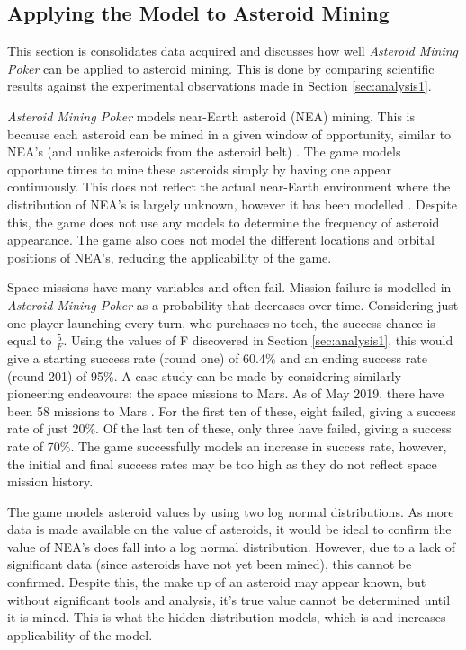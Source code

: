 \documentclass[11pt, twoside]{article}
\begin{document}
\subsection{Applying the Model to Asteroid Mining} \label{sec:FindingsAM}
This section is consolidates data acquired and discusses how well \textit{Asteroid Mining Poker} can be applied to asteroid mining. This is done by comparing scientific results against the experimental observations made in Section \ref{sec:analysis1}.

\textit{Asteroid Mining Poker} models near-Earth asteroid (NEA) mining. This is because each asteroid can be mined in a given window of opportunity, similar to NEA's (and unlike asteroids from the asteroid belt) \cite{sonter2006asteroid}. The game models opportune times to mine these asteroids simply by having one appear continuously. This does not reflect the actual near-Earth environment where the distribution of NEA's is largely unknown, however it has been modelled \cite{bottke2000understanding}. Despite this, the game does not use any models to determine the frequency of asteroid appearance. The game also does not model the different locations and orbital positions of NEA's, reducing the applicability of the game.

Space missions have many variables and often fail. Mission failure is modelled in \textit{Asteroid Mining Poker} as a probability that decreases over time. Considering just one player launching every turn, who purchases no tech, the success chance is equal to $\frac{5}{F}$. Using the values of F discovered in Section \ref{sec:analysis1}, this would give a starting success rate (round one) of 60.4\% and an ending success rate (round 201) of 95\%. A case study can be made by considering similarly pioneering endeavours: the space missions to Mars. As of May 2019, there have been 58 missions to Mars \cite{MarsExpl75:online}. For the first ten of these, eight failed, giving a success rate of just 20\%. Of the last ten of these, only three have failed, giving a success rate of 70\%. The game successfully models an increase in success rate, however, the initial and final success rates may be too high as they do not reflect space mission history. 

The game models asteroid values by using two log normal distributions. As more data is made available on the value of asteroids, it would be ideal to confirm the value of NEA's does fall into a log normal distribution. However, due to a lack of significant data (since asteroids have not yet been mined), this cannot be confirmed. Despite this, the make up of an asteroid may appear known, but without significant tools and analysis, it's true value cannot be determined until it is mined. This is what the hidden distribution models, which is and increases applicability of the model.
\end{document}
